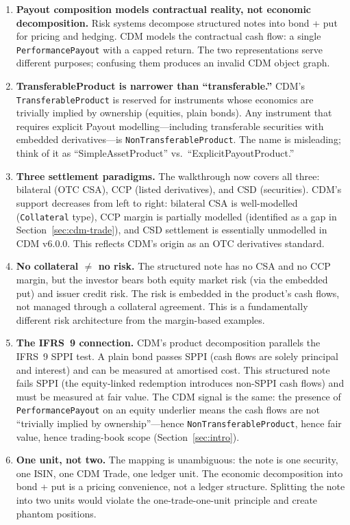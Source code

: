 \documentclass[11pt,a4paper]{article}
\begin{document}
\begin{enumerate}
\item \textbf{Payout composition models contractual reality, not economic decomposition.} Risk systems decompose structured notes into bond + put for pricing and hedging. CDM models the contractual cash flow: a single \texttt{PerformancePayout} with a capped return. The two representations serve different purposes; confusing them produces an invalid CDM object graph.

\item \textbf{TransferableProduct is narrower than ``transferable.''} CDM's \texttt{TransferableProduct} is reserved for instruments whose economics are trivially implied by ownership (equities, plain bonds). Any instrument that requires explicit Payout modelling---including transferable securities with embedded derivatives---is \texttt{NonTransferableProduct}. The name is misleading; think of it as ``SimpleAssetProduct'' vs.\ ``ExplicitPayoutProduct.''

\item \textbf{Three settlement paradigms.} The walkthrough now covers all three: bilateral (OTC CSA), CCP (listed derivatives), and CSD (securities). CDM's support decreases from left to right: bilateral CSA is well-modelled (\texttt{Collateral} type), CCP margin is partially modelled (identified as a gap in Section~\ref{sec:cdm-trade}), and CSD settlement is essentially unmodelled in CDM v6.0.0. This reflects CDM's origin as an OTC derivatives standard.

\item \textbf{No collateral $\neq$ no risk.} The structured note has no CSA and no CCP margin, but the investor bears both equity market risk (via the embedded put) and issuer credit risk. The risk is embedded in the product's cash flows, not managed through a collateral agreement. This is a fundamentally different risk architecture from the margin-based examples.

\item \textbf{The IFRS~9 connection.} CDM's product decomposition parallels the IFRS~9 SPPI test. A plain bond passes SPPI (cash flows are solely principal and interest) and can be measured at amortised cost. This structured note fails SPPI (the equity-linked redemption introduces non-SPPI cash flows) and must be measured at fair value. The CDM signal is the same: the presence of \texttt{PerformancePayout} on an equity underlier means the cash flows are not ``trivially implied by ownership''---hence \texttt{NonTransferableProduct}, hence fair value, hence trading-book scope (Section~\ref{sec:intro}).

\item \textbf{One unit, not two.} The mapping is unambiguous: the note is one security, one ISIN, one CDM Trade, one ledger unit. The economic decomposition into bond + put is a pricing convenience, not a ledger structure. Splitting the note into two units would violate the one-trade-one-unit principle and create phantom positions.
\end{enumerate}
\end{document}
